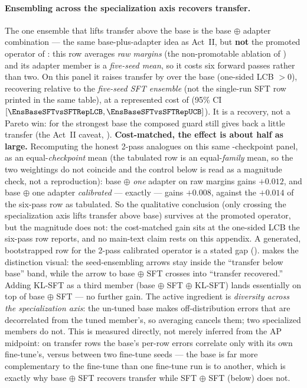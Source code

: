 \paragraph{Ensembling across the specialization axis recovers transfer.} The one ensemble that lifts
transfer above the base is the base $\oplus$ adapter combination --- the same base-plus-adapter idea as
Act~II, but \textbf{not} the promoted operator of : this row averages \emph{raw margins}
(the non-promotable ablation of ) and its adapter member is a \emph{five-seed
mean}, so it costs six forward passes rather than two. On this panel it raises transfer by
\EnsBaseSFTvsBaseTrans{} over the base
(one-sided LCB \EnsBaseSFTvsBaseTransLCB{} $>0$), recovering \EnsBaseSFTvsSFTTrans{} relative to the
\emph{five-seed SFT ensemble} (not the single-run SFT row printed in the same table),
at a represented cost of \EnsBaseSFTvsSFTRep{} (95\% CI $[\EnsBaseSFTvsSFTRepLCB, \EnsBaseSFTvsSFTRepUCB]$).
It is a recovery, not a Pareto win: for the strongest base the composed guard still gives back a little
transfer (the Act~II caveat, ). \textbf{Cost-matched, the effect is about half as large.}
Recomputing the honest 2-pass analogues on this same \EnsNCk{}-checkpoint panel, as an
equal-\emph{checkpoint} mean (the tabulated row is an equal-\emph{family} mean, so the two weightings
do not coincide and the control below is read as a magnitude check, not a reproduction):
base $\oplus$ \emph{one} adapter on raw margins gains
$+0.012$, and base $\oplus$ one adapter \emph{calibrated} --- exactly  --- gains $+0.008$,
against the $+0.014$ of the six-pass row as tabulated. So the qualitative conclusion (only crossing the specialization
axis lifts transfer above base) survives at the promoted operator, but the magnitude does not: the
cost-matched gain sits at the one-sided LCB the six-pass row reports, and no main-text claim rests on this
appendix. A generated, bootstrapped row for the 2-pass calibrated operator is a stated gap
().  makes the distinction visual:
the seed-ensembling arrows stay inside the ``transfer below base'' band, while the arrow to base $\oplus$
SFT crosses into ``transfer recovered.'' Adding KL-SFT as a third member (base $\oplus$ SFT $\oplus$
KL-SFT) lands essentially on top of base $\oplus$ SFT --- no further gain. The active ingredient is
\emph{diversity across the specialization axis}: the un-tuned base makes off-distribution errors that are
decorrelated from the tuned member's, so averaging cancels them; two specialized members do not. This is
measured directly, not merely inferred from the AP midpoint: on transfer rows the base's per-row errors
correlate only \EnsErrCorrBaseSFT{} with its own fine-tune's, versus \EnsErrCorrSFTSFT{} between two
fine-tune seeds --- the base is far more complementary to the fine-tune than one fine-tune run is to
another, which is exactly why base $\oplus$ SFT recovers transfer while SFT $\oplus$ SFT (below) does not.

